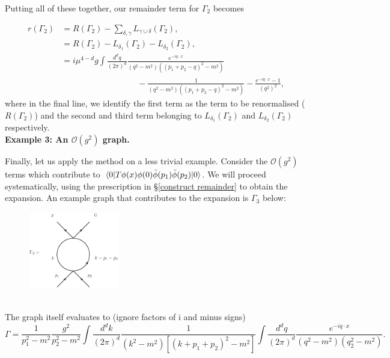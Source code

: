 \documentclass{article}
\begin{document}
Putting all of these together, our remainder term for $\Gamma_2$ becomes

\begin{equation}
    \begin{split}
        r(\Gamma_2) &= R(\Gamma_2) - \sum_{\delta,\gamma} L_{\gamma \cup \delta}(\Gamma_2),\\
        &= R(\Gamma_2) - L_{\delta_1}(\Gamma_2) - L_{\delta_2}(\Gamma_2),\\
        &=i\mu^{4-d}g \int \frac{d^dq}{(2\pi)^d} \frac{e^{-iq\cdot x}}{(q^2-m^2)((p_1+p_2-q)^2-m^2)} \\
        &\quad\quad\quad\quad\quad\quad\quad\quad\quad - \frac{1}{(q^2-m^2)((p_1+p_2-q)^2-m^2)} - \frac{e^{-iq\cdot x}-1}{(q^2)^2},
    \end{split}
\end{equation}
where in the final line, we identify the first term as the term to be renormalised ($R(\Gamma_2)$) and the second and  third term belonging to $L_{\delta_1}(\Gamma_2)$ and $L_{\delta_2}(\Gamma_2)$ respectively. \\

\noindent\textbf{Example 3: An $\mathcal{O}(g^2)$ graph.}\label{example3}

Finally, let us apply the method on a less trivial example. Consider the $\mathcal{O}(g^2)$ terms which contribute to $\mel{0}{T\phi(x)\phi(0)\Tilde{\phi}(p_1)\Tilde{\phi}(p_2)}{0}$. We will proceed systematically, using the prescription in  \S\ref{construct remainder} to obtain the expansion. An example graph that contributes to the expansion is $\Gamma_3$ below:
\begin{figure}[H]
\centering
\includegraphics[width=0.35\textwidth]{Graphs/Gamma.eps}
\end{figure}\\

The graph itself evaluates to (ignore factors of i and minus signs)
\begin{equation} \label{Gamma_3}
    \Gamma = \frac{1}{p_1^2-m^2}\frac{g^2}{p_2^2-m^2} \int \frac{d^dk}{(2\pi)^d}\frac{1}{(k^2-m^2)[(k+p_1+p_2)^2-m^2]}\int \frac{d^dq}{(2\pi)^d}\frac{e^{-iq\cdot x}}{(q^2-m^2)(q_2^2-m^2)}.
\end{equation}
\end{document}
